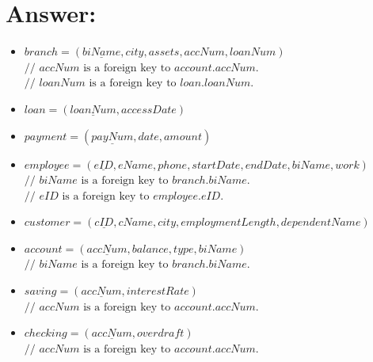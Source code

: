 \documentclass{article}
\begin{document}
\section*{Answer:}

\begin{itemize}
	\item \(branch = (\underline{biName}, city, assets, accNum, loanNum)\)
		\(\text{// } accNum \text{ is a foreign key to } account.accNum\).
		\(\text{// } loanNum \text{ is a foreign key to } loan.loanNum\).
	\item \(loan = (\underline{loanNum}, accessDate)\) \\
	
\end{itemize}

\begin{itemize}
	\item \(payment = (\underline{payNum}, date, amount)\) \\
\end{itemize}

\begin{itemize}
	\item \(employee = (\underline{eID}, eName, phone, startDate, endDate, biName, work)\) \\
	\(\text{// } biName \text{ is a foreign key to } branch.biName\). \\
	\(\text{// } eID \text{ is a foreign key to } employee.eID\).
\end{itemize}

\begin{itemize}
	\item \(customer = (\underline{cID}, cName, city, employmentLength, dependentName)\)
\end{itemize}

\begin{itemize}
	\item \(account = (\underline{accNum}, balance, type, biName)\) \\
	\(\text{// } biName \text{ is a foreign key to } branch.biName\).
\end{itemize}

\begin{itemize}
	\item \(saving = (\underline{accNum}, interestRate)\) \\
	\(\text{// } accNum \text{ is a foreign key to } account.accNum\).
\end{itemize}

\begin{itemize}
	\item \(checking = (\underline{accNum}, overdraft)\) \\
	\(\text{// } accNum \text{ is a foreign key to } account.accNum\).
\end{itemize}
\end{document}
